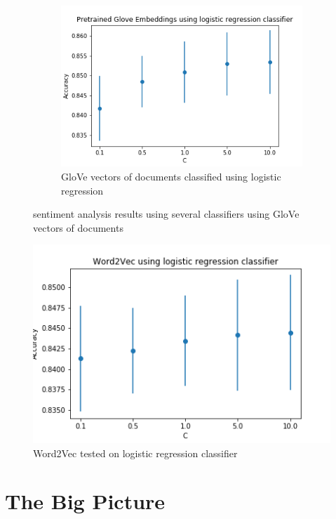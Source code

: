 \documentclass{article}
\begin{document}
\begin{figure}
        \begin{subfigure}[b]{0.5\textwidth}
            \includegraphics[width=\textwidth]{glove-lr.png}
            \caption{GloVe vectors of documents classified using logistic regression}
            \label{fig:glove-lr}
        \end{subfigure}
        
        \caption{sentiment analysis results using several classifiers using GloVe vectors of documents}\label{fig:glove}
    \end{figure}
    
    
    \begin{figure}
        \centering
        \includegraphics{word2vec-lr.png}
        \caption{Word2Vec tested on logistic regression classifier}
        \label{fig:word2vec}
    \end{figure}
	
	\section{The Big Picture}
	
\end{document}
